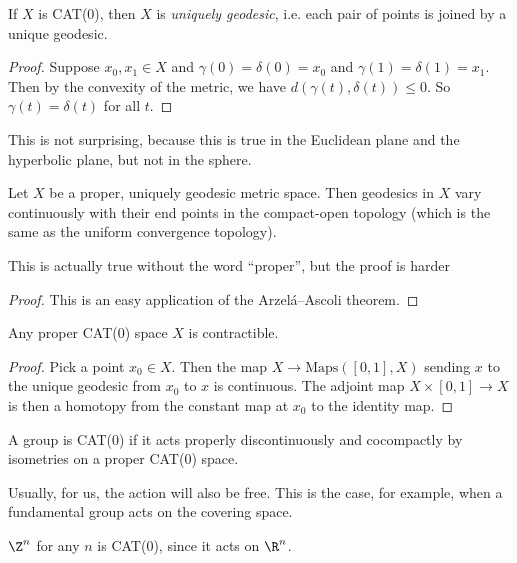 \documentclass[a4paper]{article}
\begin{document}
\begin{lemma}
  If $X$ is CAT(0), then $X$ is \emph{uniquely geodesic}, i.e. each pair of points is joined by a unique geodesic.
\end{lemma}

\begin{proof}
  Suppose $x_0, x_1 \in X$ and $\gamma(0) = \delta(0) = x_0$ and $\gamma(1) = \delta(1) = x_1$. Then by the convexity of the metric, we have $d(\gamma(t), \delta(t)) \leq 0$. So $\gamma(t) = \delta(t)$ for all $t$. %
\end{proof}
This is not surprising, because this is true in the Euclidean plane and the hyperbolic plane, but not in the sphere.

\begin{lemma}
  Let $X$ be a proper, uniquely geodesic metric space. Then geodesics in $X$ vary continuously with their end points in the compact-open topology (which is the same as the uniform convergence topology).
\end{lemma}
This is actually true without the word ``proper'', but the proof is harder

\begin{proof}
  This is an easy application of the Arzel\'a--Ascoli theorem. 
\end{proof}

\begin{prop}
  Any proper CAT(0) space $X$ is contractible.
\end{prop}

\begin{proof}
  Pick a point $x_0 \in X$. Then the map $X \to \mathrm{Maps}([0, 1], X)$ sending $x$ to the unique geodesic from $x_0$ to $x$ is continuous. The adjoint map $X \times [0, 1] \to X$ is then a homotopy from the constant map at $x_0$ to the identity map.
\end{proof}

\begin{defi}
  A group is CAT(0) if it acts properly discontinuously and cocompactly by isometries on a proper CAT(0) space.
\end{defi}
Usually, for us, the action will also be free. This is the case, for example, when a fundamental group acts on the covering space.

\begin{eg}
  $\Z^n$ for any $n$ is CAT(0), since it acts on $\R^n$.
\end{eg}
\end{document}
